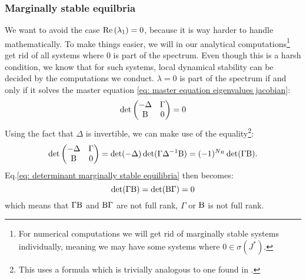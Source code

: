 \documentclass[12pt, titlepage]{report}
\begin{document}
\subsubsection{Marginally stable equilbria}
We want to avoid the case $\text{Re}\left(\lambda_1\right)=0$, because it is way harder to handle mathematically. To make things easier, we will in our analytical computations\footnote{For numerical computations we will get rid of marginally stable systems individually, meaning we may have some systems where $0 \in \sigma(J^*)$.} get rid of all systems where 0 is part of the spectrum. Even though this is a harsh condition, we know that for such systems, local dynamical stability can be decided by the computations we conduct. $\lambda=0$ is part of the spectrum if and only if it solves the master equation \eqref{eq: master equation eigenvalues jacobian}:
\begin{equation}
\det
\begin{pmatrix}
  -\Delta   & \Gamma \\
  \text{B} & 0
\end{pmatrix} = 0 \label{eq: determinant marginally stable equilibria}
\end{equation}
Using the fact that $\Delta$ is invertible, we can make use of the equality\footnote{This uses a formula which is trivially analogous to one found in \cite{powell_calculating_2011}.}:
\begin{equation}
\det\begin{pmatrix}
  -\Delta   & \Gamma \\
  \text{B} & 0
\end{pmatrix} = \det(-\Delta)\det(\Gamma\Delta^{-1}\text{B}) = (-1)^{N_R}\det(\Gamma\text{B}).
\end{equation}
Eq.\eqref{eq: determinant marginally stable equilibria} then becomes:
\begin{equation}
\det(\Gamma\text{B})=\det(\text{B}\Gamma)=0
\end{equation}
which means that $\Gamma\text{B}$ and $\text{B}\Gamma$ are not full rank, \ie $\Gamma$ or $\text{B}$ is not full rank.
\end{document}

